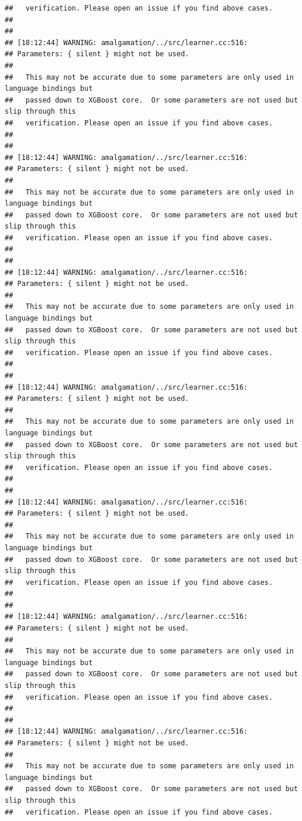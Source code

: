 \documentclass[AMS,STIX2COL]{WileyNJD-v2}\usepackage[]{graphicx}\usepackage[]{color}
\makeatletter
\newenvironment{kframe}{%
 \def\at@end@of@kframe{}%
 \ifinner\ifhmode%
  \def\at@end@of@kframe{\end{minipage}}%
  \begin{minipage}{\columnwidth}%
 \fi\fi%
 \def\FrameCommand##1{\hskip\@totalleftmargin \hskip-\fboxsep
 \colorbox{shadecolor}{##1}\hskip-\fboxsep
     \hskip-\linewidth \hskip-\@totalleftmargin \hskip\columnwidth}%
 \MakeFramed {\advance\hsize-\width
   \@totalleftmargin\z@ \linewidth\hsize
   \@setminipage}}%
 {\par\unskip\endMakeFramed%
 \at@end@of@kframe}
\newenvironment{knitrout}{}{} %
\makeatother
\begin{document}
\begin{knitrout}
\begin{kframe}
\begin{verbatim}
##   verification. Please open an issue if you find above cases.
## 
## 
## [18:12:44] WARNING: amalgamation/../src/learner.cc:516: 
## Parameters: { silent } might not be used.
## 
##   This may not be accurate due to some parameters are only used in language bindings but
##   passed down to XGBoost core.  Or some parameters are not used but slip through this
##   verification. Please open an issue if you find above cases.
## 
## 
## [18:12:44] WARNING: amalgamation/../src/learner.cc:516: 
## Parameters: { silent } might not be used.
## 
##   This may not be accurate due to some parameters are only used in language bindings but
##   passed down to XGBoost core.  Or some parameters are not used but slip through this
##   verification. Please open an issue if you find above cases.
## 
## 
## [18:12:44] WARNING: amalgamation/../src/learner.cc:516: 
## Parameters: { silent } might not be used.
## 
##   This may not be accurate due to some parameters are only used in language bindings but
##   passed down to XGBoost core.  Or some parameters are not used but slip through this
##   verification. Please open an issue if you find above cases.
## 
## 
## [18:12:44] WARNING: amalgamation/../src/learner.cc:516: 
## Parameters: { silent } might not be used.
## 
##   This may not be accurate due to some parameters are only used in language bindings but
##   passed down to XGBoost core.  Or some parameters are not used but slip through this
##   verification. Please open an issue if you find above cases.
## 
## 
## [18:12:44] WARNING: amalgamation/../src/learner.cc:516: 
## Parameters: { silent } might not be used.
## 
##   This may not be accurate due to some parameters are only used in language bindings but
##   passed down to XGBoost core.  Or some parameters are not used but slip through this
##   verification. Please open an issue if you find above cases.
## 
## 
## [18:12:44] WARNING: amalgamation/../src/learner.cc:516: 
## Parameters: { silent } might not be used.
## 
##   This may not be accurate due to some parameters are only used in language bindings but
##   passed down to XGBoost core.  Or some parameters are not used but slip through this
##   verification. Please open an issue if you find above cases.
## 
## 
## [18:12:44] WARNING: amalgamation/../src/learner.cc:516: 
## Parameters: { silent } might not be used.
## 
##   This may not be accurate due to some parameters are only used in language bindings but
##   passed down to XGBoost core.  Or some parameters are not used but slip through this
##   verification. Please open an issue if you find above cases.

\end{verbatim}
\end{kframe}
\end{knitrout}
\end{document}
